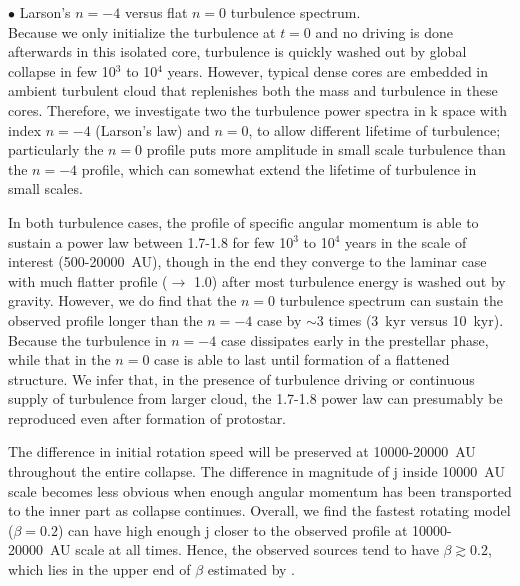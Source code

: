 \noindent $\bullet$ Larson's $n=-4$ versus flat $n=0$ turbulence spectrum.\\
Because we only initialize the turbulence at $t=0$ and no driving
is done afterwards in this isolated core, turbulence is quickly
washed out by global collapse in few 10$^3$ to 10$^4$ years. However, typical
dense cores are embedded in ambient turbulent cloud that replenishes
both the mass and turbulence in these cores.
Therefore, we investigate two the turbulence power spectra in k space
with index $n=-4$ (Larson's law) and $n=0$, to allow different lifetime
of turbulence; particularly the $n=0$ profile puts more amplitude in
small scale turbulence than the $n=-4$ profile, which can somewhat
extend the lifetime of turbulence in small scales.

In both turbulence cases, the profile of specific angular momentum
is able to sustain a power law between 1.7-1.8 for few 10$^3$ to 10$^4$ years
in the scale of interest (500-20000~AU), though in the end they
converge to the laminar case with much flatter profile ($\rightarrow$ 1.0)
after most turbulence energy is washed out by gravity.
However, we do find that the $n=0$ turbulence spectrum can sustain the
observed profile longer than the $n=-4$ case by $\sim$3 times
(3~kyr versus 10~kyr). Because the turbulence in $n=-4$ case dissipates
early in the prestellar phase, while that in the $n=0$ case is
able to last until formation of a flattened structure.
We infer that, in the presence of turbulence driving or continuous supply
of turbulence from larger cloud, the 1.7-1.8 power law can presumably be
reproduced even after formation of protostar.

The difference in initial rotation speed will be preserved at 10000-20000~AU 
throughout the entire collapse. The difference in magnitude of j 
inside 10000~AU scale becomes less obvious when enough angular momentum has 
been transported to the inner part as collapse continues. 
Overall, we find the fastest rotating model ($\beta=0.2$) can have high enough
j closer to the observed profile at 10000-20000~AU scale at all times. 
Hence, the observed sources tend to have $\beta\gtrsim0.2$, which
lies in the upper end of $\beta$ estimated by \citet{Goodman_1993}.


  

  
  